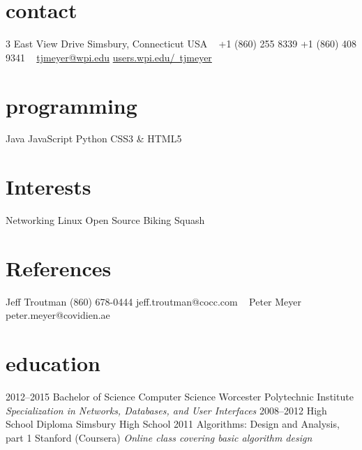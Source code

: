 \documentclass[]{friggeri-cv} %
\begin{document}


\begin{aside} %
\section{contact}
3 East View Drive
Simsbury, Connecticut
USA
~
+1 (860) 255 8339
+1 (860) 408 9341
~
\href{mailto:tjmeyer@wpi.edu}{tjmeyer@wpi.edu}
\href{http://users.wpi.edu/~tjmeyer}{users.wpi.edu/~tjmeyer}
\section{programming}
Java
JavaScript
Python
CSS3 \& HTML5
\section{Interests}
Networking
Linux
Open Source
Biking
Squash
\section{References}
Jeff Troutman
(860) 678-0444
jeff.troutman@cocc.com
~
Peter Meyer
peter.meyer@covidien.ae
\end{aside}


\section{education}

\begin{entrylist}
\entry
{2012--2015}
{Bachelor of Science {\normalfont Computer Science}}
{Worcester Polytechnic Institute}
{\emph{Specialization in Networks, Databases, and User Interfaces}}
\entry
{2008--2012}
{High School Diploma}
{Simsbury High School}
{}
\entry
{2011}
{Algorithms: Design and Analysis, part 1}
{Stanford (Coursera)}
{\emph{Online class covering basic algorithm design}}
\end{entrylist}
\end{document}
